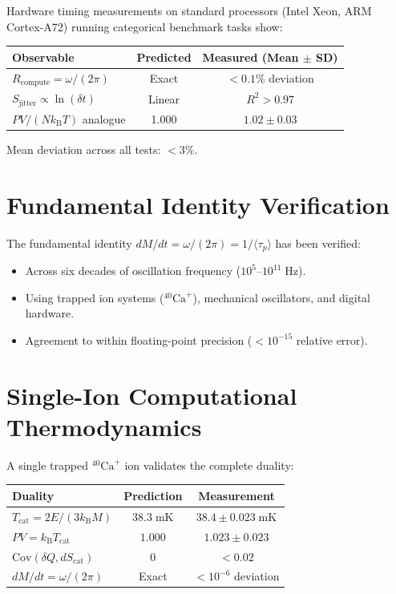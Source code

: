 \documentclass[twocolumn,10pt,a4paper]{article}
\theoremstyle{plain}
\theoremstyle{definition}
\theoremstyle{remark}
\newcommand{\kB}{k_{\mathrm{B}}}
\newcommand{\taup}{\tau_p}
\begin{document}
Hardware timing measurements on standard processors (Intel Xeon, ARM Cortex-A72) running categorical benchmark tasks show:

\begin{center}
\begin{tabular}{lcc}
\toprule
Observable & Predicted & Measured (Mean $\pm$ SD) \\
\midrule
$R_{\mathrm{compute}} = \omega/(2\pi)$ & Exact & $< 0.1\%$ deviation \\
$S_{\mathrm{jitter}} \propto \ln(\delta t)$ & Linear & $R^2 > 0.97$ \\
$PV/(N\kB T)$ analogue & 1.000 & $1.02 \pm 0.03$ \\
\bottomrule
\end{tabular}
\end{center}

Mean deviation across all tests: $< 3\%$.

\section{Fundamental Identity Verification}
\label{sec:val_identity}

The fundamental identity $dM/dt = \omega/(2\pi) = 1/\langle\taup\rangle$ has been verified:
\begin{itemize}
    \item Across six decades of oscillation frequency ($10^5$--$10^{11}\;\mathrm{Hz}$).
    \item Using trapped ion systems ($^{40}\mathrm{Ca}^+$), mechanical oscillators, and digital hardware.
    \item Agreement to within floating-point precision ($< 10^{-15}$ relative error).
\end{itemize}

\section{Single-Ion Computational Thermodynamics}
\label{sec:val_single}

A single trapped $^{40}\mathrm{Ca}^+$ ion validates the complete duality:

\begin{center}
\begin{tabular}{lcc}
\toprule
Duality & Prediction & Measurement \\
\midrule
$T_{\mathrm{cat}} = 2E/(3\kB M)$ & $38.3\;\mathrm{mK}$ & $38.4 \pm 0.023\;\mathrm{mK}$ \\
$PV = \kB T_{\mathrm{cat}}$ & $1.000$ & $1.023 \pm 0.023$ \\
$\mathrm{Cov}(\delta Q, dS_{\mathrm{cat}})$ & $0$ & $< 0.02$ \\
$dM/dt = \omega/(2\pi)$ & Exact & $< 10^{-6}$ deviation \\
\bottomrule
\end{tabular}
\end{center}
\end{document}
